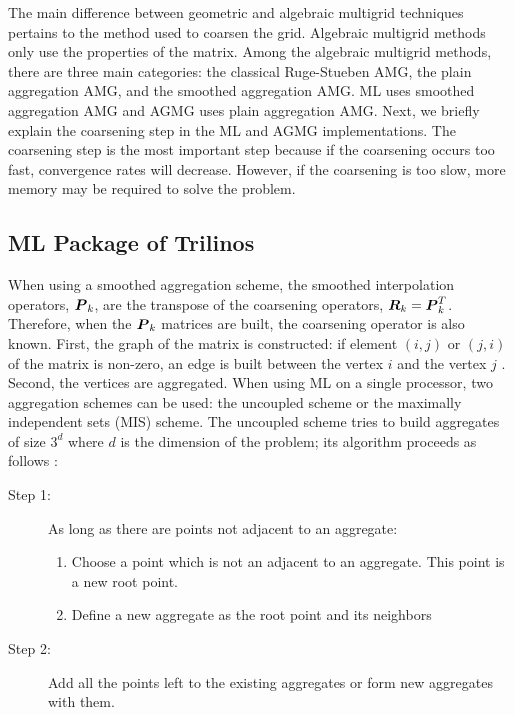 The main difference between geometric and algebraic multigrid techniques
pertains to the method used
to coarsen the grid. Algebraic multigrid methods only use the properties of the
matrix. Among the algebraic multigrid methods, there are three main categories: 
the classical Ruge-Stueben AMG, the plain aggregation AMG, and the
smoothed aggregation AMG. ML uses smoothed aggregation AMG and AGMG
uses plain aggregation AMG. Next, we briefly explain the coarsening step in
the ML and AGMG implementations. The coarsening step is the most important 
step because if the coarsening occurs too fast, convergence rates will 
decrease. However, if the coarsening is too slow, more memory may be 
required to solve the problem. 

\subsection{ML Package of Trilinos}
When using a smoothed aggregation scheme, the smoothed interpolation operators,
$\boldsymbol{P}_k$, are the transpose of the coarsening operators,
$\boldsymbol{R}_k=\boldsymbol{P}_k^T$. Therefore, when the $\boldsymbol{P}_k$ matrices are built, the
coarsening operator is also known. First, the graph of the matrix is
constructed: if element $(i,j)$ or $(j,i)$ of the matrix is non-zero, an edge
is built between the vertex $i$ and the vertex $j$ \cite{ml_guide}. Second,
the vertices are 
aggregated. When using ML on a single processor, two aggregation schemes can
be used: the uncoupled scheme or the maximally independent sets (MIS) scheme. 
The uncoupled scheme tries to build aggregates of size $3^d$ where $d$ is the
dimension of the problem; its algorithm proceeds as follows \cite{mis}:
\begin{description}
  \item[Step 1:] As long as there are points not adjacent to an aggregate:
    \begin{enumerate}
      \item Choose a point which is not an adjacent to an
        aggregate. This point is a new root point.
      \item Define a new aggregate as the root point and its neighbors 
    \end{enumerate}
  \item[Step 2:] Add all the points left to the existing aggregates or form 
    new aggregates with them.
\end{description}
